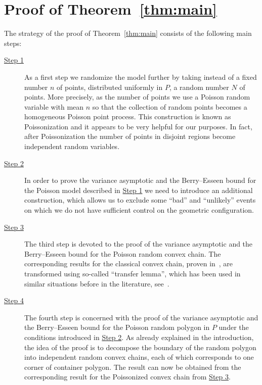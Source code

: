 \documentclass[AHL,Unicode,longabstracts,published]{cedram}
\begin{document}
\section{Proof of Theorem~\ref{thm:main}}\label{sec:ProofSquare}

The strategy of the proof of Theorem~\ref{thm:main} consists of the following main steps:
\begin{description}
\item[{\hyperref[subsec1]{Step 1}}] As a first step we randomize the model further by taking instead of a fixed number $n$ of points, distributed uniformly in $P$, a random number $N$ of points. More precisely, as the number of points we use a Poisson random variable with mean $n$ so that the collection of random points becomes a homogeneous Poisson point process. This construction is known as Poissonization and it appears to be very helpful for our purposes. In fact, after Poissonization the number of points in disjoint regions become independent random variables.

\item[{\hyperref[step2]{Step 2}}] In order to prove the variance asymptotic and the Berry--Esseen bound for the Poisson model described in \hyperref[subsec1]{Step 1} we need to introduce an additional construction, which allows us to exclude some ``bad'' and ``unlikely'' events on which we do not have sufficient control on the geometric configuration.

\item[{\hyperref[step3]{Step 3}}] The third step is devoted to the proof of the variance asymptotic and the Berry--Esseen bound for the Poisson random convex chain. The corresponding results for the classical convex chain, proven in~\cite{GT21}, are transformed using so-called ``transfer lemma'', which has been used in similar situations before in the literature, see~\cite{BR06,BR10, BV06,Reitz05,Vu06}.

\item[{\hyperref[step4]{Step 4}}] The fourth step is concerned with the proof of the variance asymptotic and the Berry--Esseen bound for the Poisson random polygon in $P$ under the conditions introduced in \hyperref[step2]{Step 2}. As already explained in the introduction, the idea of the proof is to decompose the boundary of the random polygon into independent random convex chains, each of which corresponds to one corner of container polygon. The result can now be obtained from the corresponding result for the Poissonized convex chain from \hyperref[step3]{Step 3}.


\end{description}
\end{document}
